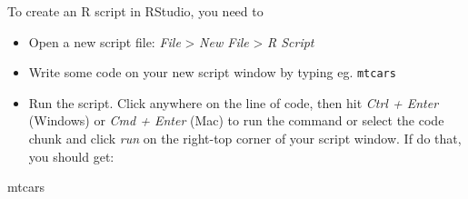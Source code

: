 \documentclass[
  letterpaper,
  krantz2]{style/krantz}
\newenvironment{Shaded}{\begin{snugshade}}{\end{snugshade}}
\newcommand{\NormalTok}[1]{\textcolor[rgb]{0.00,0.23,0.31}{#1}}
\begin{document}
To create an R script in RStudio, you need to

\begin{itemize}
\item
  Open a new script file: \emph{File} \textgreater{} \emph{New File}
  \textgreater{} \emph{R Script}
\item
  Write some code on your new script window by typing eg.
  \texttt{mtcars}
\item
  Run the script. Click anywhere on the line of code, then hit
  \emph{Ctrl + Enter} (Windows) or \emph{Cmd + Enter} (Mac) to run the
  command or select the code chunk and click \emph{run} on the right-top
  corner of your script window. If do that, you should get:
\end{itemize}

\begin{Shaded}
\begin{Highlighting}[]
\NormalTok{mtcars}
\end{Highlighting}
\end{Shaded}
\end{document}
